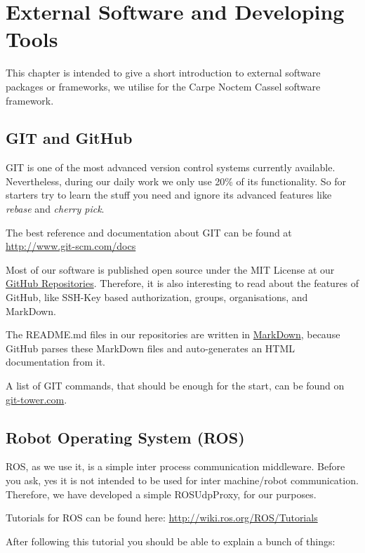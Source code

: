 \chapter{External Software and Developing Tools}
\label{chap:ExtSoftware}

This chapter is intended to give a short introduction to external software packages or frameworks, we utilise for the Carpe Noctem Cassel software framework.

\section{GIT and GitHub}
\label{sec:Git}

GIT is one of the most advanced version control systems currently available. Nevertheless, during our daily work we only use 20\% of its functionality. So for starters try to learn the stuff you need and ignore its advanced features like \emph{rebase} and \emph{cherry pick}.

The best reference and documentation about GIT can be found at \url{http://www.git-scm.com/docs}

Most of our software is published open source under the MIT License at our \href{https://github.com/dasys-lab}{GitHub Repositories}. Therefore, it is also interesting to read about the features of GitHub, like SSH-Key based authorization, groups, organisations, and MarkDown.

The README.md files in our repositories are written in \href{https://en.wikipedia.org/wiki/Markdown}{MarkDown}, because GitHub parses these MarkDown files and auto-generates an HTML documentation from it.

A list of GIT commands, that should be enough for the start, can be found on \href{https://www.git-tower.com/blog/git-cheat-sheet/}{git-tower.com}.

\section{Robot Operating System (ROS)}
\label{sec:ROS}

ROS, as we use it, is a simple inter process communication middleware. Before you ask, yes it is not intended to be used for inter machine/robot communication. Therefore, we have developed a simple ROSUdpProxy, for our purposes. 

Tutorials for ROS can be found here: \url{http://wiki.ros.org/ROS/Tutorials}

After following this tutorial you should be able to explain a bunch of things:

